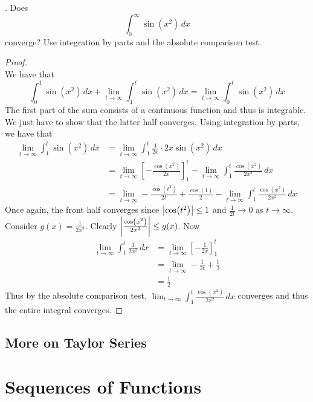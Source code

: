\documentclass[a4paper]{article}
\begin{document}
\begin{qtn}{}{}
\thetcbcounter.\;\; Does $$\int_0^\infty\sin(x^2)\,dx$$ converge? Use integration by parts and the absolute comparison test. \\\hspace*{\fill}\cite{R0002}\tcbline
\begin{proof}~\\
We have that $$\int_0^1\sin(x^2)\,dx+\lim_{t\to\infty}\int_1^t\sin(x^2)\,dx=\lim_{t\to\infty}\int_0^t\sin(x^2)\,dx$$ The first part of the sum consists of a continuous function and thus is integrable. We just have to show that the latter half converges. Using integration by parts, we have that 
\begin{align*}
\lim_{t\to\infty}\int_1^t\sin(x^2)\,dx&=\lim_{t\to\infty}\int_1^t\frac{1}{2x}\cdot 2x\sin(x^2)\,dx\tag{$x\neq 0$}\\
&=\lim_{t\to\infty}\left[-\frac{\cos(x^2)}{2x}\right]_1^t-\lim_{t\to\infty}\int_1^t\frac{\cos(x^2)}{2x^2}\,dx\\
&=\lim_{t\to\infty}-\frac{\cos(t^2)}{2t}+\frac{\cos(1)}{2}-\lim_{t\to\infty}\int_1^t\frac{\cos(x^2)}{2x^2}\,dx
\end{align*}
Once again, the front half converges since $\abs{\cos(t^2)}\leq 1$ and $\frac{1}{2t}\to 0$ as $t\to\infty$. Consider $g(x)=\frac{1}{2x^2}$. Clearly $\abs{\frac{\cos(x^2)}{2x^2}}\leq g(x)$. Now
\begin{align*}
\lim_{t\to\infty}\int_1^t\frac{1}{2x^2}\,dx&=\lim_{t\to\infty}\left[-\frac{1}{2x}\right]_1^t\\
&=\lim_{t\to\infty}-\frac{1}{2t}+\frac{1}{2}\\
&=\frac{1}{2}
\end{align*}
Thus by the absolute comparison test, $\lim_{t\to\infty}\int_1^t\frac{\cos(x^2)}{2x^2}\,dx$ converges and thus the entire integral converges. 
\end{proof}
\end{qtn}

\subsection{More on Taylor Series}

\pagebreak
\section{Sequences of Functions}
\end{document}
